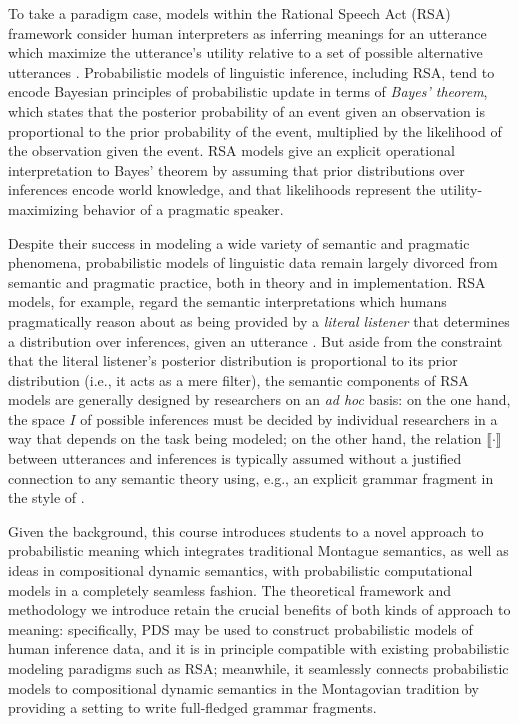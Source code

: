 \documentclass[nobib,nohyper]{tufte-handout}
\begin{document}
To take a paradigm case, models within the Rational Speech Act (RSA) framework consider human interpreters as inferring meanings for an utterance which maximize the utterance's utility relative to a set of possible alternative utterances \parencite[i.a.]{frank_predicting_2012,lassiter_vagueness_2011,goodman_knowledge_2013,goodman_pragmatic_2016,lassiter_adjectival_2017,degen_rational_2023}.
Probabilistic models of linguistic inference, including RSA, tend to encode Bayesian principles of probabilistic update in terms of \emph{Bayes' theorem}, which states that the posterior probability of an event given an observation is proportional to the prior probability of the event, multiplied by the likelihood of the observation given the event.
RSA models give an explicit operational interpretation to Bayes' theorem by assuming that prior distributions over inferences encode world knowledge, and that likelihoods represent the utility-maximizing behavior of a pragmatic speaker.

Despite their success in modeling a wide variety of semantic and pragmatic phenomena, probabilistic models of linguistic data remain largely divorced from semantic and pragmatic practice, both in theory and in implementation.
RSA models, for example, regard the semantic interpretations which humans pragmatically reason about as being provided by a \emph{literal listener} that determines a distribution over inferences, given an utterance \parencite[see][]{degen_rational_2023}.
But aside from the constraint that the literal listener's posterior distribution is proportional to its prior distribution (i.e., it acts as a mere filter), the semantic components of RSA models are generally designed by researchers on an \emph{ad hoc} basis:
on the one hand, the space \(I\) of possible inferences must be decided by individual researchers in a way that depends on the task being modeled;
on the other hand, the relation \(⟦·⟧\) between utterances and inferences is typically assumed without a justified connection to any semantic theory using, e.g., an explicit grammar fragment in the style of \textcite{montague_proper_1973}.

Given the background, this course introduces students to a novel approach to probabilistic meaning which integrates traditional Montague semantics, as well as ideas in compositional dynamic semantics, with probabilistic computational models in a completely seamless fashion.
The theoretical framework and methodology we introduce retain the crucial benefits of both kinds of approach to meaning:
specifically, PDS may be used to construct probabilistic models of human inference data, and it is in principle compatible with existing probabilistic modeling paradigms such as RSA;
meanwhile, it seamlessly connects probabilistic models to compositional dynamic semantics in the Montagovian tradition by providing a setting to write full-fledged grammar fragments.
\end{document}
